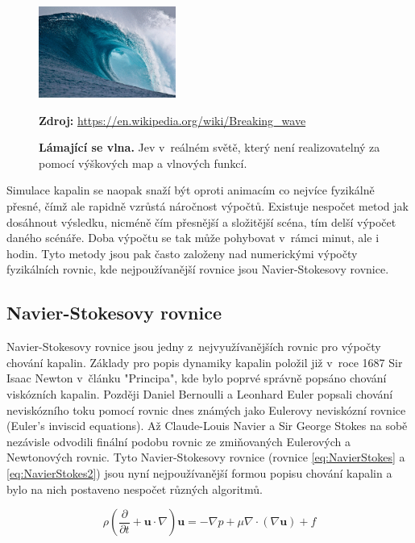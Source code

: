 \begin{figure}[hbt]
	\centering
	\captionsetup{justification=centering}
	\includegraphics[width=0.4\textwidth]{obrazky-figures/Large_breaking_wave.jpg}
	\caption{\textbf{Lámající se vlna.} Jev v~reálném světě, který není realizovatelný za pomocí výškových map a vlnových funkcí.}
	\textbf{Zdroj: } \url{https://en.wikipedia.org/wiki/Breaking_wave}
	\label{keepCalm}
\end{figure}

Simulace kapalin se naopak snaží být oproti animacím co nejvíce fyzikálně přesné, čímž ale rapidně vzrůstá náročnost výpočtů. Existuje nespočet metod jak dosáhnout výsledku, nicméně čím přesnější a složitější scéna, tím delší výpočet daného scénáře. Doba výpočtu se tak může pohybovat v~rámci minut, ale i hodin. Tyto metody jsou pak často založeny nad numerickými výpočty fyzikálních rovnic, kde nejpoužívanější rovnice jsou Navier-Stokesovy rovnice.

\subsection{Navier-Stokesovy rovnice}
Navier-Stokesovy rovnice jsou jedny z~nejvyužívanějších rovnic pro výpočty chování kapalin. Základy pro popis dynamiky kapalin položil již v~roce 1687 Sir Isaac Newton v~článku "Principa", kde bylo poprvé správně popsáno chování viskózních kapalin. Později Daniel Bernoulli a Leonhard Euler popsali chování neviskózního toku pomocí rovnic dnes známých jako Eulerovy neviskózní rovnice (Euler’s inviscid equations). Až Claude-Louis Navier a Sir George Stokes na sobě nezávisle odvodili finální podobu rovnic ze zmiňovaných Eulerových a Newtonových rovnic. Tyto Navier-Stokesovy rovnice (rovnice \ref{eq:NavierStokes} a \ref{eq:NavierStokes2})  jsou nyní nejpoužívanější formou popisu chování kapalin a bylo na nich postaveno nespočet různých algoritmů. \cite{simscale_2020}

\begin{equation}
	\rho(\frac{\partial}{\partial t} + \mathbf{u} \cdot \nabla)\mathbf{u} = -\nabla p + \mu\nabla\cdot(\nabla \mathbf{u}) + f
	\label{eq:NavierStokes}
\end{equation}


